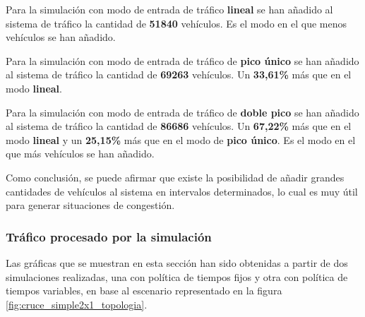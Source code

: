 Para la simulación con modo de entrada de tráfico \textbf{lineal} se han añadido al sistema de tráfico la cantidad de \textbf{51840} vehículos. Es el modo en el que menos vehículos se han añadido.

Para la simulación con modo de entrada de tráfico de \textbf{pico único} se han añadido al sistema de tráfico la cantidad de \textbf{69263} vehículos. Un \textbf{33,61\%} más que en el modo \textbf{lineal}.

Para la simulación con modo de entrada de tráfico de \textbf{doble pico} se han añadido al sistema de tráfico la cantidad de \textbf{86686} vehículos. Un \textbf{67,22\%} más que en el modo \textbf{lineal} y un \textbf{25,15\%} más que en el modo de \textbf{pico único}. Es el modo en el que más vehículos se han añadido.

Como conclusión, se puede afirmar que existe la posibilidad de añadir grandes cantidades de vehículos al sistema en intervalos determinados, lo cual es muy útil para generar situaciones de congestión.

\newpage
\subsubsection{Tráfico procesado por la simulación}
Las gráficas que se muestran en esta sección han sido obtenidas a partir de dos simulaciones realizadas, una con política de tiempos fijos y otra con política de tiempos variables, en base al escenario representado en la figura \ref{fig:cruce_simple2x1_topologia}.


